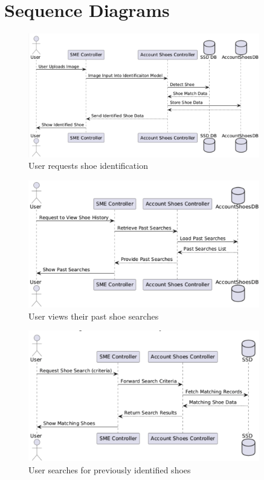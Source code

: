 \documentclass[]{article}
\begin{document}

\section{Sequence Diagrams}
\label{sec:sequence_diagrams}

\begin{figure}[H]
    \centering
    \includegraphics[width=0.9\textwidth]{S3/image (1).png}
    \caption{User requests shoe identification}
\end{figure}

\begin{figure}[H]
    \centering
    \includegraphics[width=0.9\textwidth]{S3/image (2).png}
	\caption{User views their past shoe searches}
\end{figure}

\begin{figure}[H]
    \centering
    \includegraphics[width=0.9\textwidth]{S3/image (3).png}
	\caption{User searches for previously identified shoes}
\end{figure}
\end{document}
